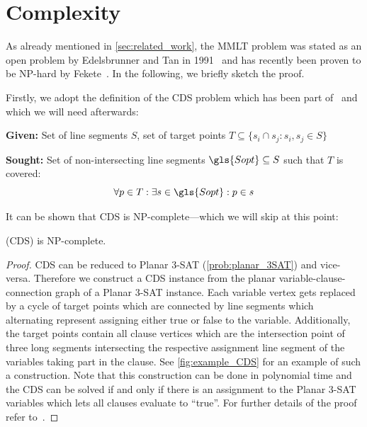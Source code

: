 \section{Complexity}
\label{sec:mmlt_complexity}
As already mentioned in \cref{sec:related_work}, the \gls{MMLT}
problem was stated as an open problem by Edelsbrunner and Tan in
1991~\cite{triangulation_minmax_length} and has recently been proven
to be NP-hard by Fekete~\cite{mmlt_complexity}. In the following, we
briefly sketch the proof.

Firstly, we adopt the definition of the \gls{CDS} problem which has
been part of~\cite{mmlt_complexity} and which we will need
afterwards:

\begin{problem}
  \label{prob:cds}\hfill
  \begin{labeling}{\hspace{4em}}
    \item[\textbf{Given:}]
      Set of line segments \(S\), 
      set of target points
      \(T \subseteq \{ s_i \cap s_j : s_i,s_j \in S \} \)
    \item[\textbf{Sought:}]
      Set of non-intersecting line segments
      \(\gls{Sopt} \subseteq S\) such that \(T\) is covered:
      \[ \forall p \in T: \exists s \in \gls{Sopt} : p \in s \]
  \end{labeling}
\end{problem}

It can be shown that \gls{CDS} is NP-complete---which we will skip at
this point:

\begin{theorem}
  \label{thm:complexity_cds}
   (\gls{CDS}) is NP-complete.
  \begin{proof}
  \gls{CDS} can be reduced to Planar 3-SAT (\cref{prob:planar_3SAT})
  and vice-versa. Therefore we construct a \gls{CDS} instance from
  the planar variable-clause-connection graph of a Planar 3-SAT
  instance. Each variable vertex gets replaced by a cycle of target
  points which are connected by line segments which alternating
  represent assigning either true or false to the variable.
  Additionally, the target points contain all clause vertices which
  are the intersection point of three long segments intersecting
  the respective assignment line segment of the variables taking
  part in the clause. See \cref{fig:example_CDS} for an example of
  such a construction. Note that this construction can be done in
  polynomial time and the \gls{CDS} can be solved if and
  only if there is an assignment to the Planar 3-SAT variables which
  lets all clauses evaluate to ``true''.
  For further details of the proof refer to~\cite{mmlt_complexity}.
  \end{proof}
\end{theorem}

